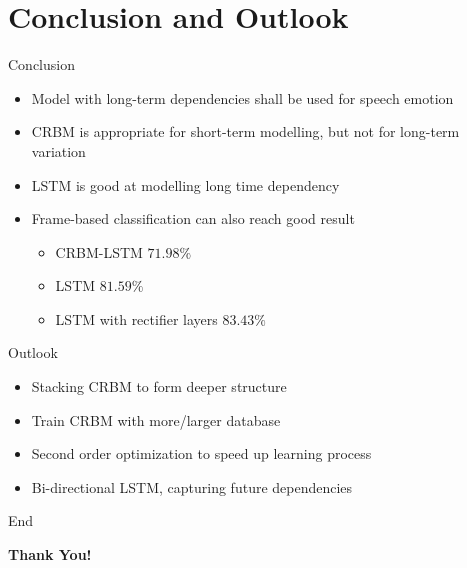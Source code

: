 \section{Conclusion and Outlook}
      \begin{frame}[t]{Conclusion}
	  \begin{itemize}
	  \itemsep10pt
	  \item Model with long-term dependencies shall be used for speech emotion
	  \item CRBM is appropriate for short-term modelling, but not for long-term variation
	  \item LSTM is good at modelling long time dependency 
	  \item Frame-based classification can also reach good result
		\vspace{5mm}
		\begin{itemize}
		 \itemsep10pt
		 \item CRBM-LSTM $71.98\%$
		 \item LSTM $81.59\%$
		 \item LSTM with rectifier layers $83.43\%$
		\end{itemize}
	  \end{itemize}
      \end{frame}
      
      \begin{frame}[t]{Outlook}
	  \begin{itemize}
	   \itemsep15pt
	   \item Stacking CRBM to form deeper structure
	   \item Train CRBM with more/larger database 
	   \item Second order optimization to speed up learning process
	   \item Bi-directional LSTM, capturing future dependencies
	  \end{itemize}

      \end{frame}

      \begin{frame}{End}
	\begin{minipage}[c]{\linewidth}
	\centering
	\textbf{\Huge Thank You!}
	\end{minipage}
      \end{frame}




